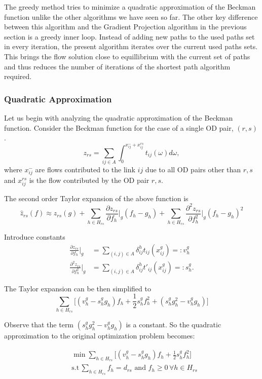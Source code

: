 The greedy method tries to minimize a quadratic approximation of the
Beckman function unlike the other algorithms we have seen so far.
The other key difference between this algorithm and the Gradient
Projection algorithm in the previous section is a greedy inner
loop. Instead of adding new paths to the used paths set in
every iteration, the present algorithm iterates over the current
used paths sets. This brings the flow solution close to equillibrium
with the current set of paths and thus reduces the number of
iterations of the shortest path algorithm required.


\subsubsection*{Quadratic Approximation}
Let us begin with analyzing the quadratic approximation of the
Beckman function.
Consider the Beckman function for the case of a single OD pair,
$(r,s)$.
\[
	z_{rs} = \sum_{ij\in A}\int_{0}^{x_{ij}^- + x_{ij}^{rs}} t_{ij}(\omega)d\omega,
\]
where $x_{ij}^-$ are flows contributed to the link $ij$ due to all
OD pairs other than $r,s$ and $x_{ij}^{rs}$ is the flow contributed
by the OD pair $r,s$.

The second order Taylor expansion of the above function is
\[
	\hat{z}_{rs}(f) \approx z_{rs}(g) +
	\sum_{h\in H_{rs}}\frac{\partial z_{rs}}{\partial f_h}\bigg|_{g}
	(f_h-g_h)+
	\sum_{h\in H_{rs}} \frac{\partial ^2 z_{rs}}{\partial f_h^2}\bigg|_g(f_h-g_h)^2
\]

Introduce constants
\begin{align}
\frac{\partial z_{rs}}{\partial f_h}\big|_{g}&=
\sum_{(i,j)\in A}\delta_{ij}^h t_{ij}(x_{ij}^g)
=: v_h^g \label{eq:v} \\
\frac{\partial ^2 z_{rs}}{\partial f_h^2}\big|_g &=
\sum_{(i,j)\in A} \delta_{ij}^h t'_{ij}(x_{ij}^g)
=: s_h^g\label{eq:s}.
\end{align}

The Taylor expansion can be then simplified to
\[
	\sum_{h\in H_{rs}}\big[(v_h^g - s_h^g g_h)f_h + \frac{1}{2}
	s_h^g f_h^2 + (s_h^g g_h^2 - v_h^g g_h)\big]
\]

Observe that the term $(s_h^g g_h^2 - v_h^g g_h)$ is a constant.
So the quadratic approximation to the original optimization
problem becomes:

\begin{equation}
\begin{split}
        &\min \sum_{h\in H_{rs}}\big[(v_h^g - s_h^g g_h)f_h +
		\frac{1}{2} s_h^g f_h^2\big]\\
		&\text{s.t}\, \sum_{h\in H_{rs}} f_h = d_{rs}
		\text{ and } f_h\geq 0 \, \forall h\in H_{rs}
\end{split}
\end{equation}


